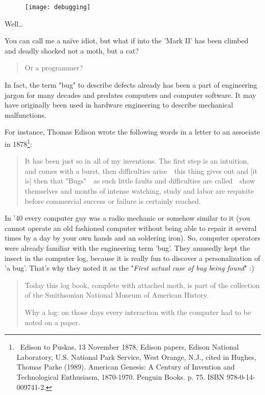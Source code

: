 \begin{figure}[!h]
\centering
\texttt{[image: debugging]}
\caption{}
\label{fig:Debugging}
\end{figure}

Well\ldots 

You can call me a naïve idiot, but what if into the 'Mark II' has been climbed and deadly shocked not a moth, but a cat?

\begin{quote}
Or a programmer?
\end{quote}

In fact, the term "bug" to describe defects already has been a part of engineering jargon for many decades and predates computers and computer software. It may have originally been used in hardware engineering to describe mechanical malfunctions. 

For instance, Thomas Edison wrote the following words in a letter to an associate in 1878\footnote{~Edison to Puskas, 13 November 1878, Edison papers, Edison National Laboratory, U.S. National Park Service, West Orange, N.J., cited in Hughes, Thomas Parke (1989). American Genesis: A Century of Invention and Technological Enthusiasm, 1870-1970. Penguin Books. p. 75. ISBN 978-0-14-009741-2.}:

\begin{quote}
    It has been just so in all of my inventions. The first step is an intuition, and comes with a burst, then difficulties arise~\textemdash~this thing gives out and [it is] then that "Bugs"~\textemdash~as such little faults and difficulties are called~\textemdash~show themselves and months of intense watching, study and labor are requisite before commercial success or failure is certainly reached.
\end{quote} 

In '40 every computer guy was a radio mechanic or somehow similar to it (you cannot operate an old fashioned computer without being able to repair it several times by a day by your own hands and an soldering iron). So, computer operators were already familiar with the engineering term 'bug'. They amusedly kept the insect in the computer log, because it is really fun to discover a personalization of 'a bug'. That's why they noted it as the "\textit{First actual case of bug being found}" :)

\begin{quote}
Today this log book, complete with attached moth, is part of the collection of the Smithsonian National Museum of American History.

Why a log: on those days every interaction with the computer had to be noted on a paper.                                                                                        \end{quote} 

